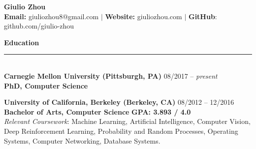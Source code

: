 \documentclass{article}
\begin{document}
\newcommand{\HRule}{\rule{\linewidth}{0.2mm}}


\begin{center}
\textbf{{\LARGE Giulio Zhou}} \\ 
\textbf{\fontsize{11}{13.2} Email:} giuliozhou8@gmail.com  $|$ \textbf{Website:} giuliozhou.com $|$ \textbf{GitHub}: github.com/giulio-zhou\\[2mm]
\end{center}


\normalsize
\noindent
\textbf{{\Large Education}}\\[-2mm]
\HRule\\
\textbf{Carnegie Mellon University (Pittsburgh, PA)}
\hfill 08/2017 -- \textit{present} \\
\indent
\textbf{PhD, Computer Science} \\
\vspace{-4mm}

\noindent
\textbf{University of California, Berkeley (Berkeley, CA)}
\hfill 08/2012 -- 12/2016 \\
\indent
\textbf{Bachelor of Arts, Computer Science}  
\hfill{\textbf{GPA: 3.893 / 4.0}}\\
\textit{Relevant Coursework}: Machine Learning, Artificial Intelligence, Computer Vision, Deep Reinforcement Learning, Probability and Random Processes, Operating Systems, Computer Networking, Database Systems.
\\
\end{document}
